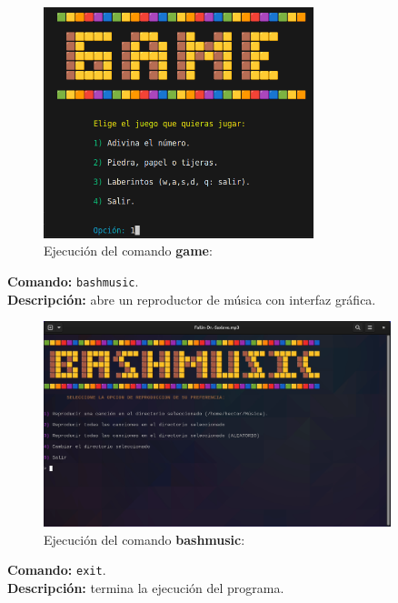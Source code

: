 \documentclass[titlepage]{article}
\begin{document}
\begin{figure}[H]
    \centering
    \includegraphics[width=0.7\textwidth]{game.png}
    \caption{Ejecución del comando \textbf{game}:}
    \label{fig:ejemplo}
\end{figure}

\noindent
\textbf{Comando:} \verb|bashmusic|. \\
\textbf{Descripción:} abre un reproductor de música con interfaz gráfica.          

\begin{figure}[H]
    \centering
    \includegraphics[width=0.9\textwidth]{bashmusic_mp.png}
    \caption{Ejecución del comando \textbf{bashmusic}:}
    \label{fig:ejemplo}
\end{figure}

\noindent
\textbf{Comando:} \verb|exit|. \\
\textbf{Descripción:} termina la ejecución del programa.           
\end{document}

